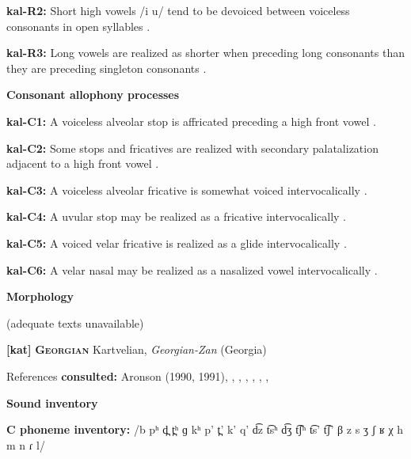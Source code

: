 \textbf{kal-R2:} Short high vowels /i u/ tend to be devoiced between voiceless consonants in open syllables \citep[335]{Fortescue1984}.



\textbf{kal-R3:} Long vowels are realized as shorter when preceding long consonants than they are preceding singleton consonants \citep[65]{Jacobsen2000}.



\textbf{Consonant allophony processes}



\textbf{kal-C1:} A voiceless alveolar stop is affricated preceding a high front vowel \citep[333]{Fortescue1984}.



\textbf{kal-C2:} Some stops and fricatives are realized with secondary palatalization adjacent to a high front vowel \citep[333]{Fortescue1984}.



\textbf{kal-C3:} A voiceless alveolar fricative is somewhat voiced intervocalically \citep[334]{Fortescue1984}.



\textbf{kal-C4:} A uvular stop may be realized as a fricative intervocalically \citep[333]{Fortescue1984}.



\textbf{kal-C5:} A voiced velar fricative is realized as a glide intervocalically \citep[334]{Fortescue1984}.



\textbf{kal-C6:} A velar nasal may be realized as a nasalized vowel intervocalically \citep[334]{Fortescue1984}.



\textbf{Morphology}



(adequate texts unavailable)



\textbf{[kat]}   \textbf{\textsc{Georgian}}    Kartvelian, \textit{Georgian-Zan} (Georgia)



References \textbf{consulted:} Aronson (1990, 1991), \citet{Chitoran1998}, \citet{Hewitt1995}, \citet{JunEtAl2006}, \citet{ShostedChikovani2006}, \citet{SkopeteasFéry2010}, \citet{Vicenek2010}, \citet{Vogt1958}



\textbf{Sound inventory}



\textbf{C phoneme inventory:} /b pʰ d̪ t̪ʰ ɡ kʰ p’ t̪’ k’ q’ d͡z t͡sʰ d͡ʒ t͡ʃʰ t͡s’ t͡ʃ’ β z s ʒ ʃ ʁ χ h m n ɾ l/



